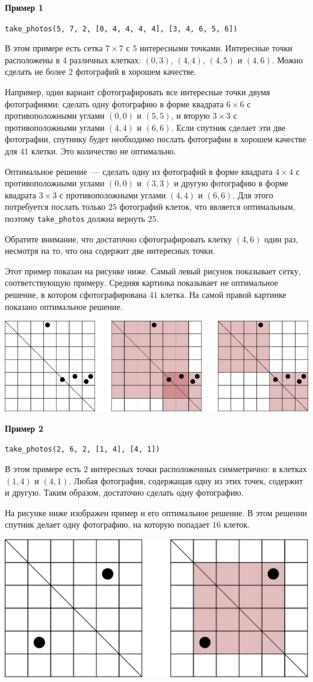 \textbf{Пример 1}

\texttt{take\_photos(5, 7, 2, [0, 4, 4, 4, 4], [3, 4, 6, 5, 6])}

В этом примере есть сетка $7 \times 7$ с $5$ интересными точками. Интересные точки расположены в 4 различных клетках: $(0, 3)$, $(4, 4)$, $(4, 5)$ и $(4, 6)$. Можно сделать не более $2$ фотографий в хорошем качестве.

Например, один вариант сфотографировать все интересные точки двумя фотографиями: сделать одну фотографию в форме квадрата $6 \times 6$ с противоположными углами $(0, 0)$ и $(5, 5)$, и вторую $3 \times 3$ с противоположными углами $(4, 4)$ и $(6, 6)$. Если спутник сделает эти две фотографии, спутнику будет необходимо послать фотографии в хорошем качестве для $41$ клетки. Это количество не оптимально.

Оптимальное решение~--- сделать одну из фотографий в форме квадрата $4 \times 4$ с противоположными углами $(0, 0)$ и $(3, 3)$ и другую фотографию в форме квадрата $3 \times 3$ с противоположными углами $(4, 4)$ и $(6, 6)$. Для этого потребуется послать только $25$ фотографий клеток, что является оптимальным, поэтому \texttt{take\_photos} должна вернуть $25$.

Обратите внимание, что достаточно сфотографировать клетку $(4, 6)$ один раз, несмотря на то, что она содержит две интересных точки.

Этот пример показан на рисунке ниже. Самый левый рисунок показывает сетку, соответствующую примеру. Средняя картинка показывает не оптимальное решение, в котором сфотографирована $41$ клетка. На самой правой картинке показано оптимальное решение.

\includegraphics[scale=1.5]{example1.png}

\textbf{Пример 2}

\texttt{take\_photos(2, 6, 2, [1, 4], [4, 1])}

В этом примере есть $2$ интересных точки расположенных симметрично: в клетках $(1, 4)$ и $(4, 1)$. Любая фотография, содержащая одну из этих точек, содержит и другую. Таким образом, достаточно сделать одну фотографию.

На рисунке ниже изображен пример и его оптимальное решение. В этом решении спутник делает одну фотографию, на которую попадает $16$ клеток.

\includegraphics[scale=1.5]{example2.png}